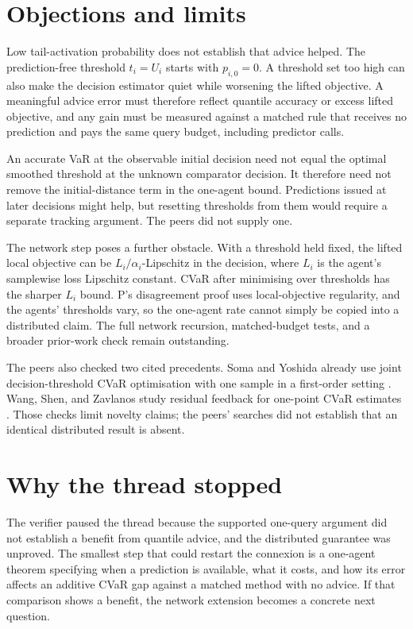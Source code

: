 \documentclass{article}
\begin{document}
\section{Objections and limits}

Low tail-activation probability does not establish that advice helped. The prediction-free threshold
\(t_i=U_i\) starts with \(p_{i,0}=0\). A threshold set too high can also make the decision estimator
quiet while worsening the lifted objective. A meaningful advice error must therefore reflect quantile
accuracy or excess lifted objective, and any gain must be measured against a matched rule that receives
no prediction and pays the same query budget, including predictor calls.

An accurate VaR at the observable initial decision need not equal the optimal smoothed threshold at the
unknown comparator decision. It therefore need not remove the initial-distance term in the one-agent
bound. Predictions issued at later decisions might help, but resetting thresholds from them would require
a separate tracking argument. The peers did not supply one.

The network step poses a further obstacle. With a threshold held fixed, the lifted local objective can be
\(L_i/\alpha_i\)-Lipschitz in the decision, where \(L_i\) is the agent's samplewise loss Lipschitz
constant. CVaR after minimising over thresholds has the sharper \(L_i\) bound. P's disagreement proof
uses local-objective regularity, and the agents' thresholds vary, so the one-agent rate cannot simply be
copied into a distributed claim. The full network recursion, matched-budget tests, and a broader
prior-work check remain outstanding.

The peers also checked two cited precedents. Soma and Yoshida already use joint decision-threshold CVaR
optimisation with one sample in a first-order setting \cite{somaYoshida}. Wang, Shen, and Zavlanos study
residual feedback for one-point CVaR estimates \cite{wangShenZavlanos}. Those checks limit novelty
claims; the peers' searches did not establish that an identical distributed result is absent.

\section{Why the thread stopped}

The verifier paused the thread because the supported one-query argument did not establish a benefit from
quantile advice, and the distributed guarantee was unproved. The smallest step that could restart the
connexion is a one-agent theorem specifying when a prediction is available, what it costs, and how its
error affects an additive CVaR gap against a matched method with no advice. If that comparison shows a
benefit, the network extension becomes a concrete next question.



\end{document}
